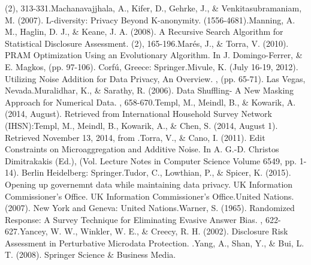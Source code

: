 \documentclass[letterpaper,10pt,english]{sphinxmanual}
\begin{document}
  (2), 313-331.Machanavajjhala, A.,
Kifer, D., Gehrke, J., \& Venkitasubramaniam, M. (2007). L-diversity:
Privacy Beyond K-anonymity.   (1556-4681).Manning, A. M., Haglin, D. J., \& Keane, J. A.
(2008). A Recursive Search Algorithm for Statistical Disclosure
Assessment.   (2),
165-196.Marés, J., \& Torra, V. (2010). PRAM Optimization Using an
Evolutionary Algorithm. In J. Domingo-Ferrer, \& E. Magkos,  (pp. 97-106). Corfú, Greece: Springer.Mivule, K.
(July 16-19, 2012). Utilizing Noise Addition for Data Privacy, An
Overview. , (pp. 65-71). Las Vegas, Nevada.Muralidhar, K.,
\& Sarathy, R. (2006). Data Shuffling- A New Masking Approach for
Numerical Data.  , 658-670.Templ, M., Meindl, B., \&
Kowarik, A. (2014, August).  Retrieved from
International Household Survey Network (IHSN):Templ, M., Meindl, B.,
Kowarik, A., \& Chen, S. (2014, August 1).  Retrieved November 13, 2014, from .Torra, V.,
\& Cano, I. (2011). Edit Constraints on Microaggregation and Additive
Noise. In A. G.-D. Christos Dimitrakakis (Ed.),  (Vol. Lecture Notes in
Computer Science Volume 6549, pp. 1-14). Berlin Heidelberg:
Springer.Tudor, C., Lowthian, P., \& Spicer, K. (2015). Opening up
governemnt data while maintaining data privacy.  UK Information Commissioner’s Office.  UK Information
Commissioner’s Office.United Nations. (2007).  New York and Geneva: United Nations.Warner, S. (1965).
Randomized Response: A Survey Technique for Eliminating Evasive Answer
Bias.  ,
622-627.Yancey, W. W., Winkler, W. E., \& Creecy, R. H. (2002).
Disclosure Risk Assessment in Perturbative Microdata Protection.
 .Yang, A., Shan, Y., \&
Bui, L. T. (2008).  Springer
Science \& Business Media.
\end{document}
